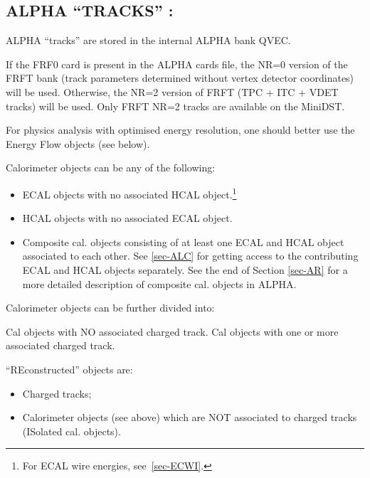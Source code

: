 \subsection{\label{sec-altrack}ALPHA ``TRACKS'' :}
\par
ALPHA ``tracks'' are stored in the internal ALPHA bank QVEC.

\begin{indentlist}{ 2.00cm}{ 2.25cm}

If the FRF0 card is present in the ALPHA cards file, the NR=0
version of the FRFT bank (track parameters determined without vertex
detector coordinates) will be used.  Otherwise, the NR=2 version
of FRFT (TPC + ITC + VDET tracks) will be used.  Only FRFT NR=2
tracks are available on the MiniDST.
 

For physics analysis with optimised energy resolution,
 one should better use the Energy Flow 
objects (see below).

Calorimeter objects can
be any of the following:
\begin{itemize}
\item ECAL objects with no associated HCAL object.\footnote{For
ECAL wire energies, see~\ref{sec-ECWI}.}
\item HCAL objects with no associated ECAL object.
\item Composite cal.
objects consisting of at least one ECAL and HCAL object
associated to each other. See \ref{sec-ALC}
for getting access to the contributing ECAL and HCAL objects separately.
See the end of Section \ref{sec-AR} for a more detailed description
of composite cal. objects in ALPHA.
\end{itemize}
Calorimeter objects can be further divided into:
\begin{indentlist}{ 2.00cm}{ 2.25cm}
Cal objects with NO associated charged track.
Cal objects with one or more associated charged track.
\end{indentlist}
 

``REconstructed'' objects are:
\begin{itemize}
\item Charged tracks;
\item Calorimeter objects (see above)
which are NOT associated to charged tracks (ISolated cal. objects).
\end{itemize}
 

\end{indentlist}
